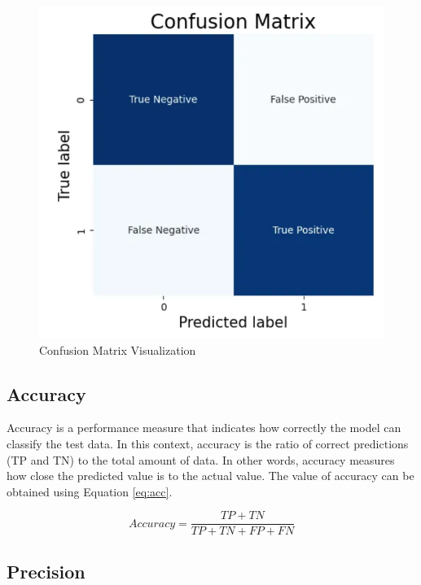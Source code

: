 \begin{figure} [ht] \centering
    \includegraphics[scale=0.3]{gambar/bab2/confusion.png}
    \caption{Confusion Matrix Visualization}
    \label{fig:confusion}
\end{figure}

\subsection{Accuracy}
\label{subsec:acc_klasifikasi}

Accuracy is a performance measure that indicates how correctly the model can classify the test data. In this context, accuracy is the ratio of correct predictions (TP and TN) to the total amount of data. In other words, accuracy measures how close the predicted value is to the actual value. The value of accuracy can be obtained using Equation \ref{eq:acc}.

\begin{equation}
  \label{eq:acc}
  Accuracy=\frac{TP+TN}{TP+TN+FP+FN}
\end{equation}

\subsection{Precision}
\label{subsec:prec_klasifikasi}

